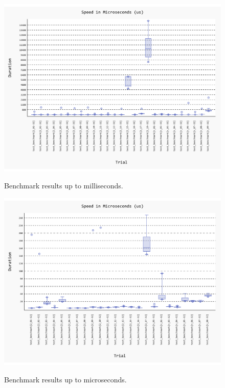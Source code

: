 \documentclass[conference]{IEEEtran}
\begin{document}
\begin{figure}[H]
    \centering
    \vspace{-20pt}
    \caption{Benchmark results up to milliseconds.}
    \includegraphics[width=\linewidth, trim=0 0 0 0, clip]{figures/benchmark/20241204_182830.pdf}
    \label{fig:benchmark_in_ms}
    \vspace{-25pt}
\end{figure}

\begin{figure}[H]
    \centering
    \vspace{-20pt}
    \caption{Benchmark results up to microseconds.}
    \includegraphics[width=\linewidth, trim=0 0 0 0, clip]{figures/benchmark/20241204_183033.pdf}
    \label{fig:benchmark_in_us}
    \vspace{-25pt}
\end{figure}
\end{document}

